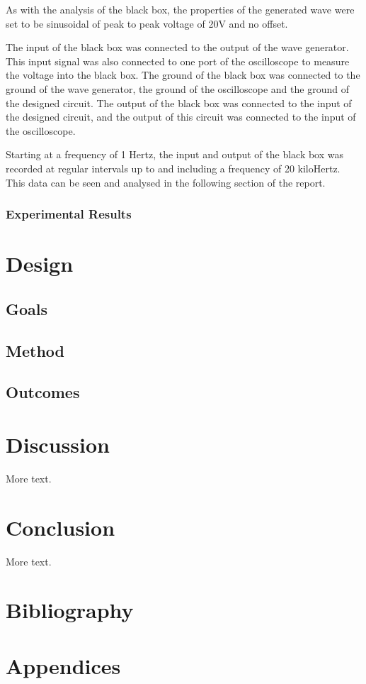 \documentclass[12pt]{article} %
\begin{document}
As with the analysis of the black box, the properties of the generated wave were set to be sinusoidal of peak to peak voltage of 20V and no offset.

The input of the black box was connected to the output of the wave generator. This input signal was also connected to one port of the oscilloscope to measure the voltage into the black box. The ground of the black box was connected to the ground of the wave generator, the ground of the oscilloscope and the ground of the designed circuit. The output of the black box was connected to the input of the designed circuit, and the output of this circuit was connected to the input of the oscilloscope.

Starting at a frequency of 1 Hertz, the input and output of the black box was recorded at regular intervals up to and including a frequency of 20 kiloHertz. This data can be seen and analysed in the following section of the report.

\subsubsection{Experimental Results}

\pagebreak





\section{Design}

\subsection{Goals}


\subsection{Method}


\subsection{Outcomes}
\pagebreak





\section{Discussion}
More text.
\pagebreak





\section{Conclusion}
More text.
\pagebreak




\section{Bibliography}
\pagebreak





\section{Appendices}
\end{document}
